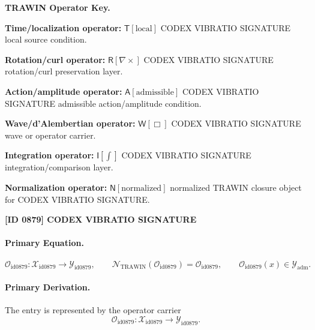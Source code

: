 \par\vspace{0.45\baselineskip}
\noindent\begin{minipage}[t]{\linewidth}
\begingroup
\small
\raggedright
\textbf{TRAWIN Operator Key.}\par
\noindent\textbf{Time/localization operator:} $\mathsf{T}\!\left[\mathrm{local}\right]$ CODEX VIBRATIO SIGNATURE local source condition.\par
\noindent\textbf{Rotation/curl operator:} $\mathsf{R}\!\left[\nabla\times\right]$ CODEX VIBRATIO SIGNATURE rotation/curl preservation layer.\par
\noindent\textbf{Action/amplitude operator:} $\mathsf{A}\!\left[\mathrm{admissible}\right]$ CODEX VIBRATIO SIGNATURE admissible action/amplitude condition.\par
\noindent\textbf{Wave/d'Alembertian operator:} $\mathsf{W}\!\left[\Box\right]$ CODEX VIBRATIO SIGNATURE wave or operator carrier.\par
\noindent\textbf{Integration operator:} $\mathsf{I}\!\left[\int\right]$ CODEX VIBRATIO SIGNATURE integration/comparison layer.\par
\noindent\textbf{Normalization operator:} $\mathsf{N}\!\left[\mathrm{normalized}\right]$ normalized TRAWIN closure object for CODEX VIBRATIO SIGNATURE.\par
\endgroup
\end{minipage}

\clearpage
\noindent\textbf{[ID 0879] CODEX VIBRATIO SIGNATURE}\par
\vspace{0.35em}
\paragraph{Primary Equation.}
\[
\mathcal{O}_{\mathrm{id0879}}:\mathcal{X}_{\mathrm{id0879}}\longrightarrow \mathcal{Y}_{\mathrm{id0879}},\qquad
\mathcal{N}_{\mathrm{TRAWIN}}(\mathcal{O}_{\mathrm{id0879}})=\mathcal{O}_{\mathrm{id0879}},\qquad
\mathcal{O}_{\mathrm{id0879}}(x)\in\mathcal{Y}_{\mathrm{adm}}.
\]

\paragraph{Primary Derivation.} The entry is represented by the operator carrier\[
\mathcal{O}_{\mathrm{id0879}}:\mathcal{X}_{\mathrm{id0879}}\longrightarrow \mathcal{Y}_{\mathrm{id0879}}.
\]

